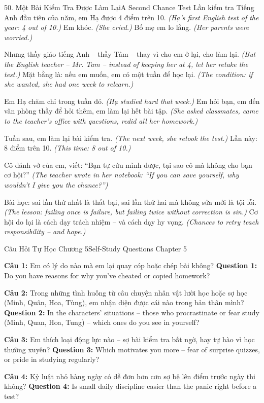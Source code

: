 \begin{truyen}{50. Một Bài Kiểm Tra Được Làm Lại}{A Second Chance Test}
Lần kiểm tra Tiếng Anh đầu tiên của năm, em Hạ được 4 điểm trên 10.
\textit{(Hạ's first English test of the year: 4 out of 10.)}
Em khóc.
\textit{(She cried.)}
Bố mẹ em lo lắng.
\textit{(Her parents were worried.)}

Nhưng thầy giáo tiếng Anh -- thầy Tâm -- thay vì cho em ở lại, cho làm lại.
\textit{(But the English teacher -- Mr. Tam -- instead of keeping her at 4, let her retake the test.)}
Mặt bằng là: nếu em muốn, em có một tuần để học lại.
\textit{(The condition: if she wanted, she had one week to relearn.)}

Em Hạ chăm chỉ trong tuần đó.
\textit{(Hạ studied hard that week.)}
Em hỏi bạn, em đến văn phòng thầy để hỏi thêm, em làm lại hết bài tập.
\textit{(She asked classmates, came to the teacher's office with questions, redid all her homework.)}

Tuần sau, em làm lại bài kiểm tra.
\textit{(The next week, she retook the test.)}
Lần này: 8 điểm trên 10.
\textit{(This time: 8 out of 10.)}

Cô đánh vở của em, viết: ``Bạn tự cứu mình được, tại sao cô mà không cho bạn cơ hội?''
\textit{(The teacher wrote in her notebook: ``If you can save yourself, why wouldn't I give you the chance?'')}

Bài học: sai lần thứ nhất là thất bại, sai lần thứ hai mà không sửa mới là tội lỗi.
\textit{(The lesson: failing once is failure, but failing twice without correction is sin.)}
Cơ hội do lại là cách dạy trách nhiệm -- và cách dạy hy vọng.
\textit{(Chances to retry teach responsibility -- and hope.)}
\end{truyen}

\begin{tuhocnhanh}{Câu Hỏi Tự Học Chương 5}{Self-Study Questions Chapter 5}

\textbf{Câu 1:} Em có lý do nào mà em lại quay cóp hoặc chép bài không?
\textbf{Question 1:} Do you have reasons for why you've cheated or copied homework?

\textbf{Câu 2:} Trong những tình huống từ câu chuyện nhân vật lười học hoặc sợ học (Minh, Quân, Hoa, Tùng), em nhận diện được cái nào trong bản thân mình?
\textbf{Question 2:} In the characters' situations -- those who procrastinate or fear study (Minh, Quan, Hoa, Tung) -- which ones do you see in yourself?

\textbf{Câu 3:} Em thích loại động lực nào -- sợ bài kiểm tra bất ngờ, hay tự hào vì học thường xuyên?
\textbf{Question 3:} Which motivates you more -- fear of surprise quizzes, or pride in studying regularly?

\textbf{Câu 4:} Kỷ luật nhỏ hàng ngày có dễ đơn hơn cơn sợ bệ lên điểm trước ngày thi không?
\textbf{Question 4:} Is small daily discipline easier than the panic right before a test?

\end{tuhocnhanh}
